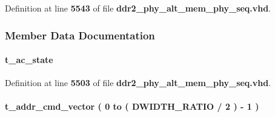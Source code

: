 Definition at line {\bf 5543} of file {\bf ddr2\+\_\+phy\+\_\+alt\+\_\+mem\+\_\+phy\+\_\+seq.\+vhd}.



\subsubsection{Member Data Documentation}
\paragraph[{ac\+\_\+state}]{ {\bfseries {\bfseries {\bf t\+\_\+ac\+\_\+state}} \textcolor{vhdlchar}{ }} \hspace{0.3cm}{\ttfamily [Signal]}}\label{classddr2__phy__alt__mem__phy__admin_1_1struct_af7d1c4e7e59f69f6963b3c5c717a5690}


Definition at line {\bf 5503} of file {\bf ddr2\+\_\+phy\+\_\+alt\+\_\+mem\+\_\+phy\+\_\+seq.\+vhd}.

\paragraph[{addr\+\_\+cmd}]{ {\bfseries {\bfseries {\bf t\+\_\+addr\+\_\+cmd\+\_\+vector}} \textcolor{vhdlchar}{ }\textcolor{vhdlchar}{(}\textcolor{vhdlchar}{ }\textcolor{vhdlchar}{ } \textcolor{vhdldigit}{0} \textcolor{vhdlchar}{ }\textcolor{keywordflow}{to}\textcolor{vhdlchar}{ }\textcolor{vhdlchar}{(}\textcolor{vhdlchar}{ }\textcolor{vhdlchar}{ }\textcolor{vhdlchar}{ }\textcolor{vhdlchar}{ }{\bfseries {\bf D\+W\+I\+D\+T\+H\+\_\+\+R\+A\+T\+IO}} \textcolor{vhdlchar}{/}\textcolor{vhdlchar}{ } \textcolor{vhdldigit}{2} \textcolor{vhdlchar}{ }\textcolor{vhdlchar}{)}\textcolor{vhdlchar}{ }\textcolor{vhdlchar}{-\/}\textcolor{vhdlchar}{ } \textcolor{vhdldigit}{1} \textcolor{vhdlchar}{ }\textcolor{vhdlchar}{)}\textcolor{vhdlchar}{ }} \hspace{0.3cm}{\ttfamily [Signal]}}\label{classddr2__phy__alt__mem__phy__admin_1_1struct_a972a173992d80333cd58304b06a55f27}


